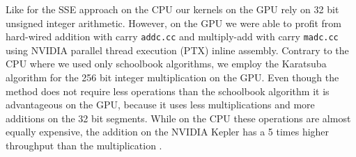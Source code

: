 \documentclass[oribibl,a4paper]{llncs2e/llncs}
\begin{document}
Like for the SSE approach on the CPU our kernels on the GPU rely on 32 bit unsigned integer arithmetic.
However, on the GPU we were able to profit from hard-wired addition with carry \verb|addc.cc| and multiply-add with carry \verb|madc.cc| using NVIDIA parallel thread execution (PTX) inline assembly.
Contrary to the CPU where we used only schoolbook algorithms, we employ the Karatsuba algorithm \cite{Karatsuba1963} for the 256 bit integer multiplication on the GPU.
Even though the method does not require less operations than the schoolbook algorithm it is advantageous on the GPU, because it uses less multiplications and more additions on the 32 bit segments.
While on the CPU these operations are almost equally expensive, the addition on the NVIDIA Kepler has a 5 times higher throughput than the multiplication \cite{CUDAProgramming}.
\end{document}
